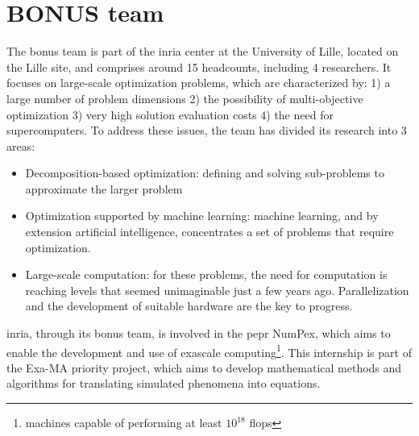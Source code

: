 \section{BONUS team}

The \gls{bonus} team is part of the \gls{inria} center at the University of Lille, located on the Lille site, and comprises around 15 headcounts, including 4 researchers. It focuses on large-scale optimization problems, which are characterized by: 1) a large number of problem dimensions 2) the possibility of multi-objective optimization 3) very high solution evaluation costs 4) the need for supercomputers.
To address these issues, the team has divided its research into 3 areas:
\begin{itemize}
  \item Decomposition-based optimization: defining and solving sub-problems to approximate the larger problem
    \item Optimization supported by machine learning: machine learning, and by extension artificial intelligence, concentrates a set of problems that require optimization.
    \item Large-scale computation: for these problems, the need for computation is reaching levels that seemed unimaginable just a few years ago. Parallelization and the development of suitable hardware are the key to progress.
\end{itemize}

\gls{inria}, through its \gls{bonus} team, is involved in the \gls{pepr} NumPex\cite{numpex}, which aims to enable the development and use of exascale computing\footnote{machines capable of performing at least $10^{18}$ \acrshort{flops}}. This internship is part of the Exa-MA priority project, which aims to develop mathematical methods and algorithms for translating simulated phenomena into equations.
